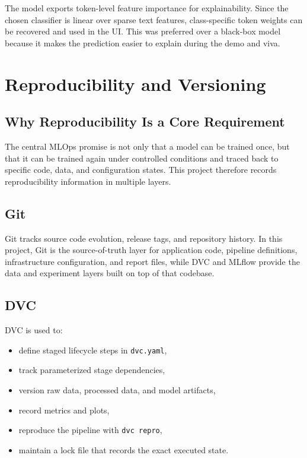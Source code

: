 \documentclass[11pt,a4paper]{article}
\begin{document}
The model exports token-level feature importance for explainability. Since the chosen classifier is linear over sparse text features, class-specific token weights can be recovered and used in the UI. This was preferred over a black-box model because it makes the prediction easier to explain during the demo and viva.

\section{Reproducibility and Versioning}

\subsection{Why Reproducibility Is a Core Requirement}

The central MLOps promise is not only that a model can be trained once, but that it can be trained again under controlled conditions and traced back to specific code, data, and configuration states. This project therefore records reproducibility information in multiple layers.

\subsection{Git}

Git tracks source code evolution, release tags, and repository history. In this project, Git is the source-of-truth layer for application code, pipeline definitions, infrastructure configuration, and report files, while DVC and MLflow provide the data and experiment layers built on top of that codebase.

\subsection{DVC}

DVC is used to:

\begin{itemize}[leftmargin=1.4em]
  \item define staged lifecycle steps in \texttt{dvc.yaml},
  \item track parameterized stage dependencies,
  \item version raw data, processed data, and model artifacts,
  \item record metrics and plots,
  \item reproduce the pipeline with \texttt{dvc repro},
  \item maintain a lock file that records the exact executed state.
\end{itemize}
\end{document}
